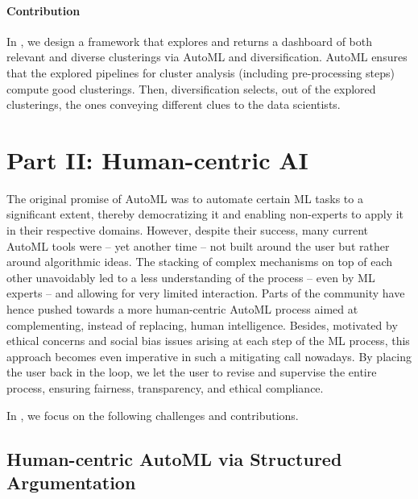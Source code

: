 \paragraph{Contribution} In , we design a framework that explores and returns a dashboard of both relevant and diverse clusterings via AutoML and diversification.
AutoML ensures that the explored pipelines for cluster analysis (including pre-processing steps) compute good clusterings.
Then, diversification selects, out of the explored clusterings, the ones conveying different clues to the data scientists.



\section*{Part II: Human-centric AI}

The original promise of AutoML was to automate certain ML tasks to a significant extent, thereby democratizing it and enabling non-experts to apply it in their respective domains.
However, despite their success, many current AutoML tools were -- yet another time -- not built around the user but rather around algorithmic ideas.
The stacking of complex mechanisms on top of each other unavoidably led to a less understanding of the process -- even by ML experts -- and allowing for very limited interaction.
Parts of the community have hence pushed towards a more human-centric AutoML process aimed at complementing, instead of replacing, human intelligence.
Besides, motivated by ethical concerns and social bias issues arising at each step of the ML process, this approach becomes even imperative in such a mitigating call nowadays.
By placing the user back in the loop, we let the user to revise and supervise the entire process, ensuring fairness, transparency, and ethical compliance.

In , we focus on the following challenges and contributions.

\subsection*{Human-centric AutoML via Structured Argumentation}

